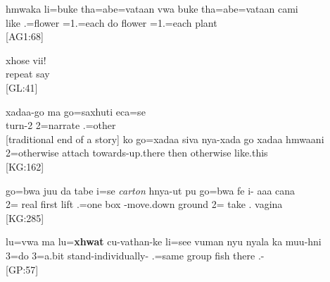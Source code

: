 \ea \label{ex:vatan}
\gll {\ob}hmwaka li=buke{\cb} {\ob}tha=abe={\ob}vataan {\ob}vwa buke{\cb\cb\cb} {\ob}tha=abe=vataan cami{\cb}\\ 
 like .=flower =1.=each do flower =1.=each plant\\ 
\glt {} {[AG1:68]}
\z

\ea \label{ex:xhose}
\gll xhose vii!\\ 
 repeat say\\ 
\glt {} {[GL:41]}
\z 

\ea \label{ex:xadaa}
\gll xadaa-go ma go=saxhuti eca=se\\ 
 turn-2  2=narrate .=other\\ 
\glt {} {[traditional end of a story]}
\z
\ea
\gll ko go={\ob}{\ob}xadaa siva{\cb} nya-xada{\cb} go xadaa hmwaani\\ 
  2=otherwise attach towards-up.there then otherwise like.this\\ 
\glt {} {[KG:162]}
\z

\ea \label{ex:daa} %
\gll  go=bwa juu {\ob\ob}da {\ob}tabe i=se \textit{carton}{\cb\cb} {\ob}hnya-ut pu{\cb\cb} go=bwa fe i- aaa cana\\ 
 2= real first lift .=one box -move.down ground 2= take .  vagina\\ 
\glt {} {[KG:285]}
\z

\ea \label{ex:xhwat}
\gll lu=vwa ma lu=\textbf{xhwat} cu-vathan-ke li=see vuman nyu nyala ka muu-hni \\ 
 3=do  3=a.bit stand-individually- .=same group fish there  .-\\ 
\glt {} {[GP:57]}
\z

